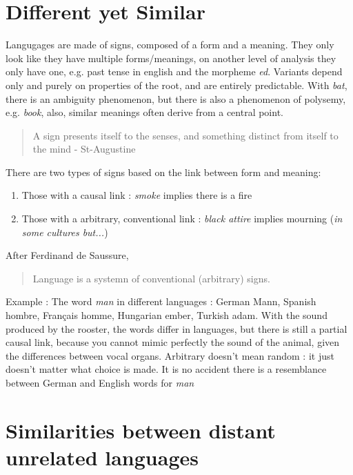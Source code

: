 \documentclass{cours}
\begin{document}
\section{Different yet Similar}
Langugages are made of signs, composed of a form and a meaning. They only look like they have multiple forms/meanings, on another level of analysis they only have one, e.g. past tense in english and the morpheme \textsl{ed}. Variants depend only and purely on properties of the root, and are entirely predictable. With \textsl{bat}, there is an ambiguity phenomenon, but there is also a phenomenon of polysemy, e.g. \textsl{book}, also, similar meanings often derive from a central point.
\begin{quote}
    \og A sign presents itself to the senses, and something distinct from itself to the mind \fg - St-Augustine
\end{quote}
There are two types of signs based on the link between form and meaning: 
\begin{enumerate}
    \item Those with a causal link : \textsl{smoke} implies there is a fire
    \item Those with a arbitrary, conventional link : \textsl{black attire} implies mourning (\textit{in some cultures but...})
\end{enumerate}
After Ferdinand de Saussure, \begin{quote}
    \og Language is a systemn of conventional (arbitrary) signs.\fg    
\end{quote}
Example : The word \textsl{man} in different languages : German Mann, Spanish hombre, Français homme, Hungarian ember, Turkish adam. With the sound produced by the rooster, the words differ in languages, but there is still a partial causal link, because you cannot mimic perfectly the sound of the animal, given the differences between vocal organs. 
Arbitrary doesn't mean random : it just doesn't matter what choice is made. It is no accident there is a resemblance between German and English words for \textsl{man}

\section{Similarities between distant unrelated languages}
\end{document}
